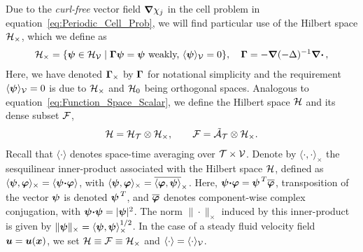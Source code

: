 \documentclass[amsa]{ipart}
\begin{document}
Due to the \emph{curl-free} vector field $\mbox{\boldmath${\nabla}$}\chi_j$ in the cell
problem in equation~\eqref{eq:Periodic_Cell_Prob}, we will find
particular use of the Hilbert space $\mathcal{H}_\times$, which we define as 
%
\begin{align}\label{eq:Hilbert_Curl_Free}
  \Hc_\times=\{\vecpsi\in\Hc_{\Vc}
  \; | \;
  \bGamma\vecpsi=\vecpsi \text{ weakly, } \langle\bpsi\rangle_{\Vc}=0\},
  \quad
  \bGamma=-\bnabla(-\Delta)^{-1}\bnabla \bcdot\,,
\end{align}
%
Here, we have denoted $\mbox{\boldmath${\Gamma}$}_\times$ by $\mbox{\boldmath${\Gamma}$}$ for notational
simplicity and the requirement $\langle\mbox{\boldmath${\psi}$}\rangle_{\mathcal{V}}=0$ is due to $\mathcal{H}_\times$ and
$\mathcal{H}_0$ being orthogonal spaces. Analogous
to equation~\eqref{eq:Function_Space_Scalar}, we define the Hilbert
space $\mathcal{H}$ and its dense subset $\mathcal{F}$,    
%
\begin{align}\label{eq:Function_Space_Vector} 
   \Hc=\Hc_{\Tc}\otimes\Hc_\times,  \qquad
   \Fc=\tilde{\Ac}_{\Tc}\otimes\Hc_\times.
\end{align}
%
Recall that $\langle\cdot\rangle$ denotes space-time averaging over $\mathcal{T}\times\mathcal{V}$. Denote
by $\langle\cdot,\cdot\rangle_\times$ the sesquilinear inner-product associated with the Hilbert
space $\mathcal{H}$, defined as $\langle\boldsymbol{\psi},\boldsymbol{\varphi}\rangle_\times=\langle\boldsymbol{\psi}\mbox{\boldmath${\cdot}$}\boldsymbol{\varphi}\rangle$, 
with $\langle\boldsymbol{\psi},\boldsymbol{\varphi}\rangle_\times=\overline{\langle\boldsymbol{\varphi},\boldsymbol{\psi}\rangle}_\times$. Here,
$\boldsymbol{\psi}\mbox{\boldmath${\cdot}$}\boldsymbol{\varphi}=\boldsymbol{\psi}^{\,T}\overline{\boldsymbol{\varphi}}$,
transposition of the vector $\boldsymbol{\psi}$ is denoted $\boldsymbol{\psi}^{\,T}$, and
$\overline{\boldsymbol{\varphi}}$ denotes component-wise complex conjugation,
with $\boldsymbol{\psi}\mbox{\boldmath${\cdot}$}\boldsymbol{\psi}=|\boldsymbol{\psi}|^2$. The norm $\|\cdot\|_\times$ induced by
this inner-product is given by $\|\boldsymbol{\psi}\|_\times=\langle\boldsymbol{\psi},\boldsymbol{\psi}\rangle_\times^{1/2}$. In
the case of a steady fluid velocity field $\boldsymbol{u}=\boldsymbol{u}(\boldsymbol{x})$, we set
$\mathcal{H}\equiv\mathcal{F}\equiv\mathcal{H}_\times$ and $\langle\cdot\rangle=\langle\cdot\rangle_{\mathcal{V}}$. 
\end{document}
